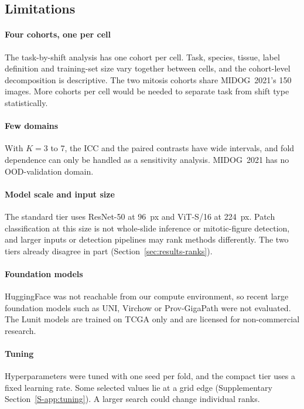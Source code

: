 

\subsection{Limitations}
\label{sec:limitations}

\paragraph{Four cohorts, one per cell} The task-by-shift analysis has one
cohort per cell. Task, species, tissue, label definition and training-set size
vary together between cells, and the cohort-level decomposition is
descriptive. The two mitosis cohorts share MIDOG~2021's 150 images. More
cohorts per cell would be needed to separate task from shift type
statistically.

\paragraph{Few domains} With $K=3$ to 7, the ICC and the paired contrasts have
wide intervals, and fold dependence can only be handled as a sensitivity
analysis. MIDOG~2021 has no OOD-validation domain.

\paragraph{Model scale and input size} The standard tier uses ResNet-50 at
96~px and ViT-S/16 at 224~px. Patch classification at this size is not
whole-slide inference or mitotic-figure detection, and larger inputs or
detection pipelines may rank methods differently. The two tiers already
disagree in part (Section~\ref{sec:results-ranks}).

\paragraph{Foundation models} HuggingFace was not reachable from our compute
environment, so recent large foundation models such as UNI, Virchow or
Prov-GigaPath \citep{chen2024uni,vorontsov2024virchow,xu2024gigapath} were not
evaluated. The Lunit models are trained on TCGA only and are licensed for
non-commercial research.

\paragraph{Tuning} Hyperparameters were tuned with one seed per fold, and the
compact tier uses a fixed learning rate. Some selected values lie at a grid
edge (Supplementary Section~\ref{S-app:tuning}). A larger search could change individual
ranks.

